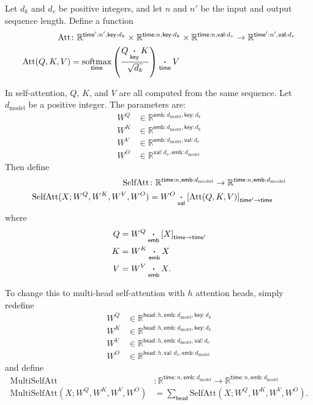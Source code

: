 \documentclass{article}
\newcommand{\name}[1]{\mathsf{#1}}
\newcommand{\nset}[2]{\name{#1}:#2}
\newcommand{\ndot}[1]{\mathbin{\mathop{\thinspace\boldsymbol\cdot\thinspace}\limits_{\name{#1}}}}
\newcommand{\nsum}[1]{\mathop{\sum}_{\name{#1}}}
\newcommand{\nfun}[2]{\mathop{\text{#2}}\limits_{\name{#1}}}
\newcommand{\nmov}[3]{\left[#3\right]_{\name{#1}\rightarrow\name{#2}}}
\newcommand{\dmodel}{d_{\text{model}}}
\begin{document}
Let $d_k$ and $d_v$ be positive integers, and let $n$ and $n'$ be the input and output sequence length. Define a function
\begin{align*}
  \text{Att} &\colon \mathbb{R}^{\nset{time'}{n'},\nset{key}{d_k}} \times \mathbb{R}^{\nset{time}{n},\nset{key}{d_k}} \times \mathbb{R}^{\nset{time}{n},\nset{val}{d_v}} \rightarrow \mathbb{R}^{\nset{time'}{n'},\nset{val}{d_v}} \\
  \text{Att}(Q,K,V) &= \nfun{time}{softmax} \left( \frac{Q \ndot{key} K}{\sqrt{d_k}} \right) \ndot{time} V
\end{align*}

In self-attention, $Q$, $K$, and $V$ are all computed from the same sequence.  Let $\dmodel$ be a positive integer. The parameters are:
\begin{align*}
  W^Q &\in \mathbb{R}^{\nset{emb}{\dmodel}, \nset{key}{d_k}} \\
  W^K &\in \mathbb{R}^{\nset{emb}{\dmodel}, \nset{key}{d_k}} \\
  W^V &\in \mathbb{R}^{\nset{emb}{\dmodel}, \nset{val}{d_v}} \\
  W^O &\in \mathbb{R}^{\nset{val}{d_v}, \nset{emb}{\dmodel}}
\end{align*}
Then define
\begin{align*}
  \text{SelfAtt} &\colon \mathbb{R}^{\nset{time}{n},\nset{emb}{\dmodel}} \rightarrow \mathbb{R}^{\nset{time}{n},\nset{emb}{\dmodel}} \\
  \text{SelfAtt}(X; W^Q, W^K, W^V, W^O) &= W^O \ndot{val} \nmov{time'}{time}{\text{Att}(Q, K, V)}
\end{align*}
where
\begin{align*}
  Q &= W^Q \ndot{emb} \nmov{time}{time'}{X} \\
  K &= W^K \ndot{emb} X \\
  V &= W^V \ndot{emb} X.
\end{align*}

To change this to multi-head self-attention with $h$ attention heads, simply redefine 
\begin{align*}
  W^Q &\in \mathbb{R}^{\nset{head}{h}, \nset{emb}{\dmodel}, \nset{key}{d_k}} \\
  W^K &\in \mathbb{R}^{\nset{head}{h}, \nset{emb}{\dmodel}, \nset{key}{d_k}} \\
  W^V &\in \mathbb{R}^{\nset{head}{h}, \nset{emb}{\dmodel}, \nset{val}{d_v}} \\
  W^O &\in \mathbb{R}^{\nset{head}{h}, \nset{val}{d_v}, \nset{emb}{\dmodel}}
\end{align*}
and define
\begin{align*}
\text{MultiSelfAtt} &\colon \mathbb{R}^{\nset{time}{n},\nset{emb}{\dmodel}} \rightarrow \mathbb{R}^{\nset{time}{n},\nset{emb}{\dmodel}} \\
\text{MultiSelfAtt}(X; W^Q, W^K, W^V, W^O) &= \nsum{head} \text{SelfAtt}(X; W^Q, W^K, W^V, W^O).
\end{align*}
\end{document}
